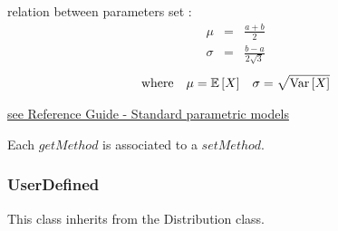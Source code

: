 \begin{description}
\begin{description}
  \item relation between parameters set :
    \begin{eqnarray*}
      \mu                                       &       =       &   \frac{a+b}{2}       \\
      \sigma                            &  =    &       \frac{b-a}{2\sqrt{3}}
    \end{eqnarray*}
    \begin{align*}
      \mbox{where}
      &&
      \mu = {\mathbb E}\left[ X \right]
      &&
      \sigma = \sqrt{{\rm Var}\left[ X \right] }
    \end{align*}
  \end{description}
  \bigskip

\item[Links :]  \rule{0pt}{1em}
  \href{OpenTURNS_ReferenceGuide.pdf}{see Reference Guide - Standard parametric models}
\end{description}


Each  $getMethod$  is associated to a $setMethod$.




\newpage \subsubsection{UserDefined}

This class inherits from the Distribution class.

